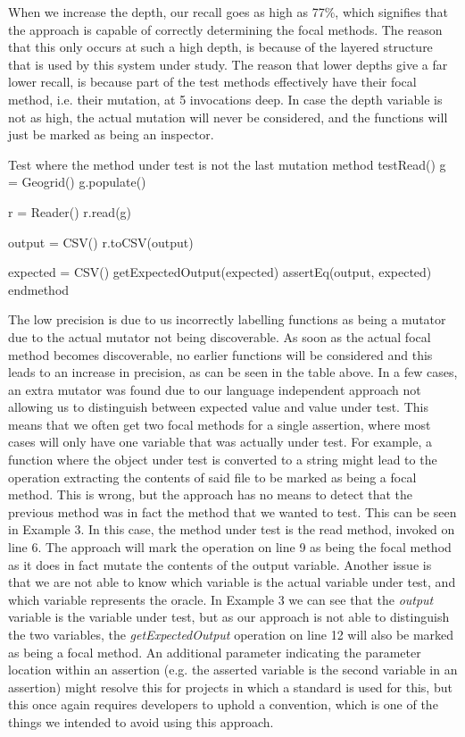 \documentclass[11pt]{article}
\begin{document}
\begin{multicols}{2}
When we increase the depth, our recall goes as high as 77\%, which signifies that the approach is capable of correctly determining the focal methods. The reason that this only occurs at such a high depth, is because of the layered structure that is used by this system under study. The reason that lower depths give a far lower recall, is because part of the test methods effectively have their focal method, i.e. their mutation, at 5 invocations deep. In case the depth variable is not as high, the actual mutation will never be considered, and the functions will just be marked as being an inspector.

\begin{sexylisting}{Test where the method under test is not the last mutation}
method testRead()
  g = Geogrid()
  g.populate()
  
  r = Reader()
  r.read(g)
  
  output = CSV()
  r.toCSV(output)
  
  expected = CSV()
  getExpectedOutput(expected)
  assertEq(output, expected)
endmethod
\end{sexylisting}

The low precision is due to us incorrectly labelling functions as being a mutator due to the actual mutator not being discoverable. As soon as the actual focal method becomes discoverable, no earlier functions will be considered and this leads to an increase in precision, as can be seen in the table above. In a few cases, an extra mutator was found due to our language independent approach not allowing us to distinguish between expected value and value under test. This means that we often get two focal methods for a single assertion, where most cases will only have one variable that was actually under test. For example, a function where the object under test is converted to a string might lead to the operation extracting the contents of said file to be marked as being a focal method. This is wrong, but the approach has no means to detect that the previous method was in fact the method that we wanted to test. This can be seen in Example 3. In this case, the method under test is the read method, invoked on line 6. The approach will mark the operation on line 9 as being the focal method as it does in fact mutate the contents of the output variable. Another issue is that we are not able to know which variable is the actual variable under test, and which variable represents the oracle. In Example 3 we can see that the \textit{output} variable is the variable under test, but as our approach is not able to distinguish the two variables, the \textit{getExpectedOutput} operation on line 12 will also be marked as being a focal method. An additional parameter indicating the parameter location within an assertion (e.g. the asserted variable is the second variable in an assertion) might resolve this for projects in which a standard is used for this, but this once again requires developers to uphold a convention, which is one of the things we intended to avoid using this approach.


\end{multicols}
\end{document}
